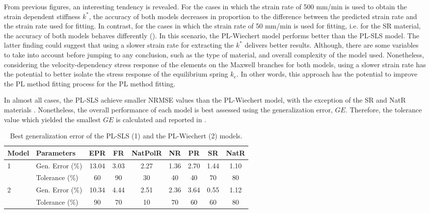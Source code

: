 From previous figures, an interesting tendency is revealed. For the cases in which the strain rate of 500 mm/min is used to obtain the strain dependent stiffness $k^*$, the accuracy of both models decreases in proportion to the difference between the predicted strain rate and the strain rate used for fitting. In contrast, for the cases in which the strain rate of 50 mm/min is used for fitting, i.e. for the SR material, the accuracy of both models behaves differently (). In this scenario, the PL-Wiechert model performs better than the PL-SLS model. The latter finding could suggest that using a slower strain rate for extracting the $k^*$ delivers better results. Although, there are some variables to take into account before jumping to any conclusion, such as the type of material, and overall complexity of the model used. Nonetheless, considering the velocity-dependency stress response of the elements on the Maxwell branches for both models, using a slower strain rate has the potential to better isolate the stress response of the equilibrium spring $k_e$. In other words, this approach has the potential to improve the PL method fitting process for the PL method fitting.

In almost all cases, the PL-SLS achieve smaller NRMSE values than the PL-Wiechert model, with the exception of the SR and NatR materials . Nonetheless, the overall performance of each model is best assessed using the generalization error, $GE$. Therefore, the tolerance value which yielded the smallest $GE$ is calculated and reported in .

\begin{table*}[htbp!]
	\centering
	\caption{Best generalization error of the PL-SLS (1) and the PL-Wiechert (2) models.}
	\label{tbl:GenError}
	\begin{tabular}{llccccccc} \toprule
		Model 					& Parameters 		& EPR	& FR 	& NatPolR & NR & PR & SR & NatR \\
		\hline
		\multirow{2}{*}{1}  & Gen. Error (\%)		& 13.04	& 3.03 	& 2.27 	& 1.36 & 2.70 & 1.44 & 1.10 \\
		& Tolerance (\%)							& 60	& 90 	& 30 	& 40 	& 40 & 70 & 80 \\
		\hline 
		\multirow{2}{*}{2}  & Gen. Error (\%)		& 10.34	& 4.44 	& 2.51 	& 2.36 & 3.64 & 0.55 & 1.12\\		
		& Tolerance	(\%)							& 90	& 70 	& 10 	& 70 	& 60 & 60 & 80 \\		
		\bottomrule
	\end{tabular}
\end{table*}

